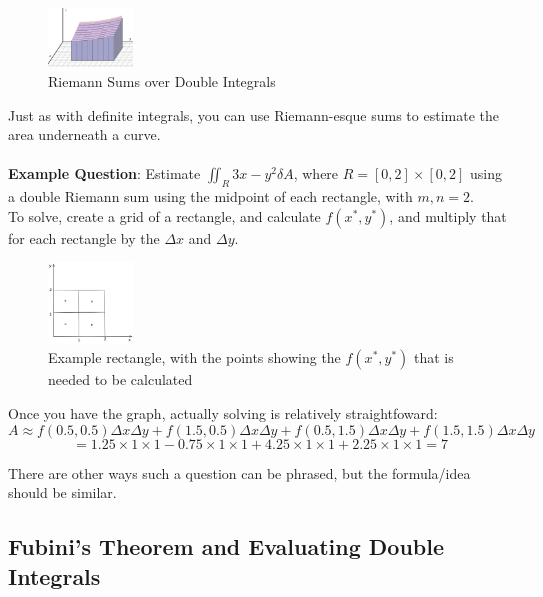 \documentclass{article}
\begin{document}
\begin{figure}[H]
    \centering
    \includegraphics[width=0.2\textwidth]{images/RiemannSumsDoubleIntegralsExample.png}
    \caption{Riemann Sums over Double Integrals}
\end{figure}

Just as with definite integrals, you can use Riemann-esque sums to estimate the area underneath a curve. \\  ~ \\
\textbf{Example Question}: Estimate $\iint_{R} 3x-y^2 \delta A$, where $R = [0,2] \times [0,2]$ using a double Riemann sum using the midpoint  of each rectangle, with $m, n = 2$.\\
To solve, create a grid of a rectangle, and calculate $f(x^*, y^*)$, and multiply that for each rectangle by the $\Delta x$ and $\Delta y$.

\begin{figure}[H]
    \centering
    \includegraphics[width=0.2\textwidth]{images/ExampleRectangle.png}
    \caption{Example rectangle, with the points showing the $f(x^*, y^*)$ that is needed to be calculated}
\end{figure}

Once you have the graph, actually solving is relatively straightfoward: $$A \approx f(0.5, 0.5)  \Delta x  \Delta y + f(1.5, 0.5)  \Delta x  \Delta y + f(0.5, 1.5)  \Delta x  \Delta y + f(1.5, 1.5)  \Delta x  \Delta y $$
$$= 1.25 \times 1 \times 1 -0.75 \times 1 \times 1 + 4.25 \times 1 \times 1 + 2.25 \times 1 \times 1 = \boxed{7}$$

There are other ways such a question can be phrased, but the formula/idea should be similar.


\subsection{Fubini's Theorem and Evaluating Double Integrals}
\end{document}
